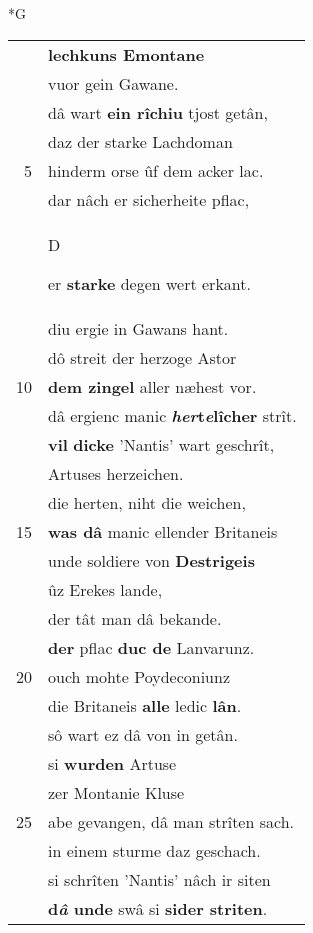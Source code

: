 \documentclass[8pt,a4paper,notitlepage]{article}
\begin{document}
\newpage
\begin{table}[ht]
\begin{minipage}[t]{0.5\linewidth}
\small
\begin{center}*G
\end{center}
\begin{tabular}{rl}
 & \textbf{lechkuns Emontane}\\ 
 & vuor gein Gawane.\\ 
 & dâ wart \textbf{ein rîchiu} tjost getân,\\ 
 & daz der starke Lachdoman\\ 
5 & hinderm orse ûf dem acker lac.\\ 
 & dar nâch er sicherheite pflac,\\ 
 & \begin{large}D\end{large}er \textbf{starke} degen wert erkant.\\ 
 & diu ergie in Gawans hant.\\ 
 & dô streit der herzoge Astor\\ 
10 & \textbf{dem zingel} aller næhest vor.\\ 
 & dâ ergienc manic \textbf{\textit{her}t\textit{e}lîcher} strît.\\ 
 & \textbf{vil} \textbf{dicke} 'Nantis' wart geschrît,\\ 
 & Artuses herzeichen.\\ 
 & die herten, niht die weichen,\\ 
15 & \textbf{was dâ} manic ellender Britaneis\\ 
 & unde soldiere von \textbf{Destrigeis}\\ 
 & ûz Erekes lande,\\ 
 & der tât man dâ bekande.\\ 
 & \textbf{der} pflac \textbf{duc de} Lanvarunz.\\ 
20 & ouch mohte Poydeconiunz\\ 
 & die Britaneis \textbf{alle} ledic \textbf{lân}.\\ 
 & sô wart ez dâ von in getân.\\ 
 & si \textbf{wurden} Artuse\\ 
 & zer Montanie Kluse\\ 
25 & abe gevangen, dâ man strîten sach.\\ 
 & in einem sturme daz geschach.\\ 
 & si schrîten 'Nantis' nâch ir siten\\ 
 & \textbf{d\textit{â} unde} swâ si \textbf{sider striten}.\\ 

\end{tabular}
\end{minipage}
\end{table}
\end{document}
